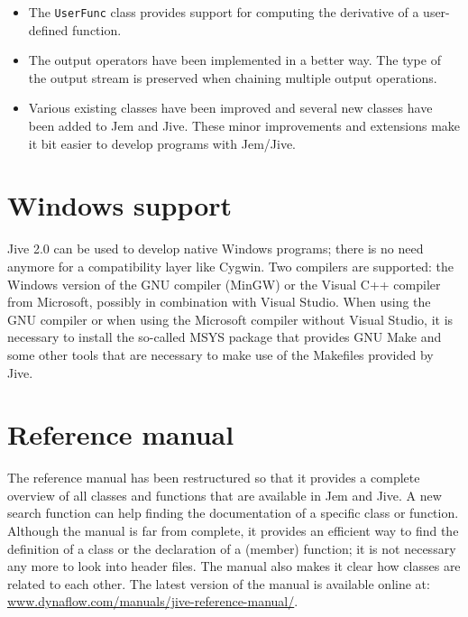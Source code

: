 \documentclass[a4paper]{article}
\newcommand{\Code}[1]{\texttt{#1}}
\begin{document}
\begin{itemize}
  \item The \Code{UserFunc} class provides support for computing the
    derivative of a user-defined function.

  \item The output operators have been implemented in a better way. The
    type of the output stream is preserved when chaining multiple output
    operations.

  \item Various existing classes have been improved and several new
    classes have been added to Jem and Jive. These minor improvements and
    extensions make it bit easier to develop programs with Jem/Jive.

\end{itemize}


\section{Windows support}

Jive 2.0 can be used to develop native Windows programs; there is no need
anymore for a compatibility layer like Cygwin. Two compilers are
supported: the Windows version of the GNU compiler (MinGW) or the Visual
C++ compiler from Microsoft, possibly in combination with Visual
Studio. When using the GNU compiler or when using the Microsoft compiler
without Visual Studio, it is necessary to install the so-called MSYS
package that provides GNU Make and some other tools that are necessary to
make use of the Makefiles provided by Jive.


\section{Reference manual}

The reference manual has been restructured so that it provides a complete
overview of all classes and functions that are available in Jem and Jive.
A new search function can help finding the documentation of a specific
class or function. Although the manual is far from complete, it provides
an efficient way to find the definition of a class or the declaration of
a (member) function; it is not necessary any more to look into header
files. The manual also makes it clear how classes are related to each
other. The latest version of the manual is available online at:
\url{www.dynaflow.com/manuals/jive-reference-manual/}.
\end{document}
